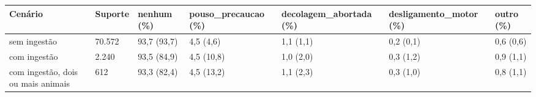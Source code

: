 \begin{tabular}{lllllll}
\toprule
Cenário & Suporte & nenhum (\%) & pouso\_precaucao (\%) & decolagem\_abortada (\%) & desligamento\_motor (\%) & outro (\%) \\
\midrule
sem ingestão & 70.572 & 93,7 (93,7) & 4,5 (4,6) & 1,1 (1,1) & 0,2 (0,1) & 0,6 (0,6) \\
com ingestão & 2.240 & 93,5 (84,9) & 4,5 (10,8) & 1,0 (2,0) & 0,3 (1,2) & 0,9 (1,1) \\
com ingestão, dois ou mais animais & 612 & 93,3 (82,4) & 4,5 (13,2) & 1,1 (2,3) & 0,3 (1,0) & 0,8 (1,1) \\
\bottomrule
\end{tabular}
